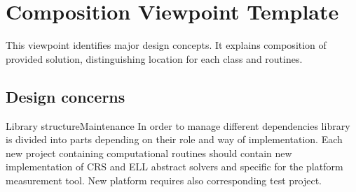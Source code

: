 \chapter{Composition Viewpoint Template} \label{chp:composition-viewpoint-template}
	\begin{comment}
		The Composition viewpoint describes the way the design subject is (recursively) structured into constituent
		parts and establishes the roles of those parts.
	\end{comment}
	This viewpoint identifies major design concepts. It explains composition of provided solution, distinguishing location for each class and routines.
	\section{Design concerns} \label{s:composition-viewpoint-template:design-concerns}
		\begin{comment}
			Software developers and maintainers use this viewpoint to identify the major design constituents of the
			design subject, to localize and allocate functionality, responsibilities, or other design roles to these
			constituents. In maintenance, it can be used to conduct impact analysis and localize the efforts of making
			changes. Reuse, on the level of existing subsystems and large-grained components, can be addressed as
			well. The information in a Composition view can be used by acquisition management and in project
			management for specification and assignment of work packages, and for planning, monitoring, and control
			of a software project. This information, together with other project information, can be used in estimating
			cost, staffing, and schedule for the development effort. Configuration management may use the information
			to establish the organization, tracking, and change management of emerging work products (see
			IEEE Std 12207-2008 [B21]).
		\end{comment}
		
		\begin{concerns}{Library structure}{Maintenance}
			In order to manage different dependencies library is divided into parts depending on their role and way of implementation. Each new project containing computational routines should contain new implementation of \gls{CRS} and \gls{ELL} abstract solvers and specific for the platform measurement tool. New platform requires also corresponding test project.
		\end{concerns}

